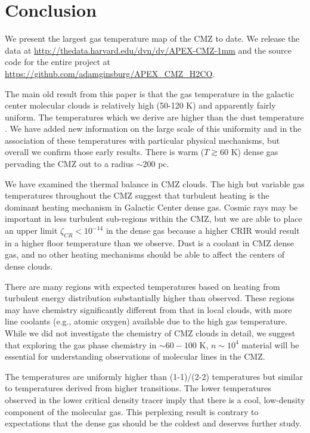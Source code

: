 \section{Conclusion}
We present the largest gas temperature map of the CMZ to date.  We release the
data at \url{http://thedata.harvard.edu/dvn/dv/APEX-CMZ-1mm} and the source
code for the entire project at
\url{https://github.com/adamginsburg/APEX_CMZ_H2CO}.  

The main old result from this paper is that the gas temperature in the galactic
center molecular clouds is relatively high (50-120 K) and apparently fairly
uniform.  The temperatures which we derive are higher than the dust temperature
\citep[][; see their conclusion]{Guesten1981a}.  We have added new information
on the large scale of this uniformity and in the association of these
temperatures with particular physical mechanisms, but overall we confirm those
early results.  There is warm ($T\gtrsim60$ K) dense gas pervading the CMZ out
to a radius $\sim200$ pc.

We have examined the thermal balance in CMZ clouds.
The high but variable gas temperatures throughout the CMZ suggest that
turbulent heating is the dominant heating mechanism in Galactic Center dense
gas.  Cosmic rays may be important in less turbulent sub-regions within the
CMZ, but we are able to place an upper limit $\zeta_{CR} < 10^{-14}$ \pers in
the dense gas because a higher CRIR would result in a higher floor temperature
than we observe.  Dust is a coolant in CMZ dense gas, and no other heating
mechanisms should be able to affect the centers of dense clouds.

There are many regions with expected temperatures based on heating from
turbulent energy distribution substantially higher than observed.  These
regions may have chemistry significantly different from that
in local clouds, with more line coolants (e.g., atomic oxygen) available due to
the high gas temperature.  While we did not investigate the chemistry of CMZ
clouds in detail, we suggest that exploring the gas phase chemistry in
$\sim60-100$ K, $n\sim10^4$ \percc material will be essential for understanding
observations of molecular lines in the CMZ.

The \formaldehyde temperatures are uniformly higher than \ammonia (1-1)/(2-2)
temperatures but similar to temperatures derived from higher \ammonia
transitions.  The lower temperatures observed in the lower critical density
tracer imply that there is a cool, low-density component of the molecular gas.
This perplexing result is contrary to expectations that the dense gas should be
the coldest and deserves further study.

